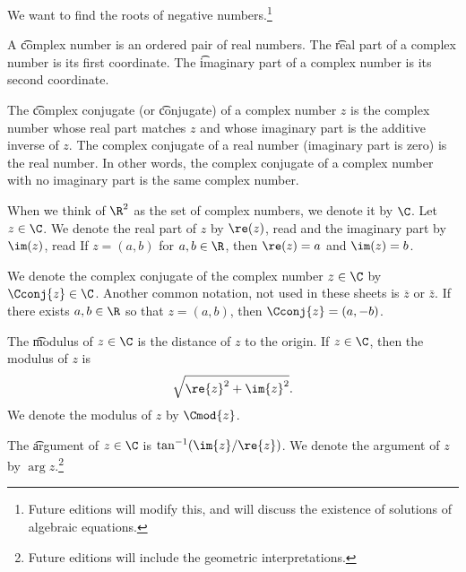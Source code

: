 

We want to find the roots of negative numbers.\footnote{Future editions will modify this, and will discuss the existence of solutions of algebraic equations.}


A \t{complex number} is an ordered pair of real numbers.
The \t{real part} of a complex number is its first coordinate.
The \t{imaginary part} of a complex number is its second coordinate.

The \t{complex conjugate} (or \t{conjugate}) of a complex number $z$ is the complex number whose real part matches $z$ and whose imaginary part is the additive inverse of $z$.
The complex conjugate of a real number (imaginary part is zero) is the real number.
In other words, the complex conjugate of a complex number with no imaginary part is the same complex number.


When we think of $\R^2$ as the set of complex numbers, we denote it by $\C$.
Let $z \in \C$.
We denote the real part of $z$ by $\re(z)$, read  and the imaginary part by $\im(z)$, read 
If $z = (a, b)$ for $a, b \in \R$, then $\re(z) = a$ and $\im(z) = b$.

We denote the complex conjugate of the complex number $z \in \C$ by $\Cconj{z} \in \C$.
Another common notation, not used in these sheets is $\overline{z}$ or $\bar{z}$.
If there exists $a, b \in \R$ so that $z = (a, b)$, then $\Cconj{z} = (a, -b)$.


The \t{modulus} of $z \in \C$ is the distance of $z$ to the origin.
If $z \in \C$, then the modulus of $z$ is
\[
  \sqrt{\re{z}^2 + \im{z}^2}.
\]
We denote the modulus of $z$ by $\Cmod{z}$.

The \t{argument} of $z \in \C$ is $\tan^{-1}(\im{z}/\re{z})$.
We denote the argument of $z$ by $\arg z$.\footnote{Future editions will include the geometric interpretations.}

\blankpage
